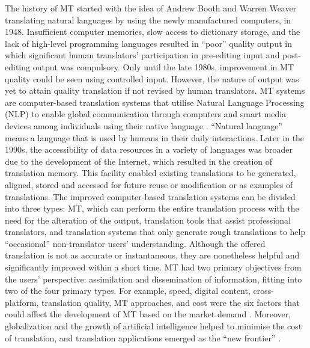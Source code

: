 \documentclass[english]{textolivre}
\begin{document}
The history of MT started with the idea of Andrew Booth and Warren Weaver translating natural languages by using the newly manufactured computers, in 1948. Insufficient computer memories, slow access to dictionary storage, and the lack of high-level programming languages resulted in “poor” quality output in which significant human translators’ participation in pre-editing input and post-editing output was compulsory. Only until the late 1980s, improvement in MT quality could be seen using controlled input. However, the nature of output was yet to attain quality translation if not revised by human translators. MT systems are computer-based translation systems that utilise Natural Language Processing (NLP) to enable global communication through computers and smart media devices among individuals using their native language \cite{gunarto_apps-based_2019}. “Natural language” means a language that is used by humans in their daily interactions. Later in the 1990s, the accessibility of data resources in a variety of languages was broader due to the development of the Internet, which resulted in the creation of translation memory. This facility enabled existing translations to be generated, aligned, stored and accessed for future reuse or modification or as examples of translations. The improved computer-based translation systems can be divided into three types: MT, which can perform the entire translation process with the need for the alteration of the output, translation tools that assist professional translators, and translation systems that only generate rough translations to help “occasional” non-translator users’ understanding. Although the offered translation is not as accurate or instantaneous, they are nonetheless helpful and significantly improved within a short time. MT had two primary objectives from the users’ perspective: assimilation and dissemination of information, fitting into two of the four primary types. For example, speed, digital content, cross-platform, translation quality, MT approaches, and cost were the six factors that could affect the development of MT based on the market demand \cite{sreelekha_survey_2016}. Moreover, globalization and the growth of artificial intelligence helped to minimise the cost of translation, and translation applications emerged as the “new frontier” \cite{jimenez_crespo_mobile_2016}.
\end{document}
